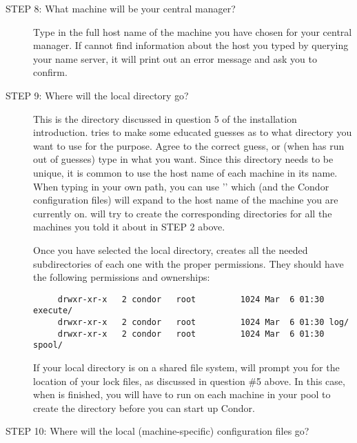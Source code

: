 \begin{description}

\item[STEP 8: What machine will be your central manager?]

     Type in the full host name of the machine you have chosen
     for your central manager.  If  cannot find
     information about the host you typed by querying your name server,
     it will print out an error message and ask you to confirm.


\item[STEP 9: Where will the local directory go?]

     This is the directory discussed in question 5 of the installation
     introduction.   tries to make some educated guesses
     as to what directory you want to use for the purpose.
     Agree to the correct guess, or (when  has run out
     of guesses) type in what you want.  Since this directory needs to
     be unique, it is common to use the host name of each machine in
     its name.  When typing in your own path, you can use
     '' which 
     (and the Condor configuration files)
     will expand to the host name of the machine you are currently on.
      will try to create the corresponding directories
     for all the machines you told it about in STEP 2 above.

     Once you have selected the local directory, 
     creates all the needed subdirectories of each one with the proper
     permissions.  They should have the following permissions and
     ownerships:
\begin{verbatim}
     drwxr-xr-x   2 condor   root         1024 Mar  6 01:30 execute/
     drwxr-xr-x   2 condor   root         1024 Mar  6 01:30 log/
     drwxr-xr-x   2 condor   root         1024 Mar  6 01:30 spool/
\end{verbatim}

     If your local directory is on a shared file system,
      will prompt you for the location of your lock
     files, as discussed in question \#5 above.  In this case, when
      is finished, you will have to run  on
     each machine in your pool to create the  directory before you
     can start up Condor.


\item[STEP 10: Where will the local (machine-specific) configuration files go?]


\end{description}
